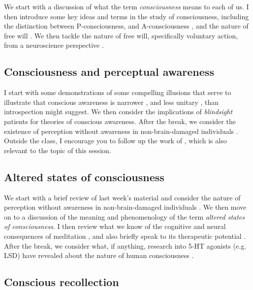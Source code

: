 \documentclass[11pt]{article}
\begin{document}
We start with a discussion of what the term \emph{consciousness} means
to each of us. I then introduce some key ideas and terms in the study
of consciousness, including the distinction between P-consciousness,
and A-consciousness \cite{block95}, and the nature of free will
\cite{freewill}.  We then tackle the nature of free will, specifically
voluntary action, from a neuroscience perspective
\cite{lau04,libet83,haggard05}.

\subsection{Consciousness and perceptual awareness}

I start with some demonstrations of some compelling illusions that
serve to illustrate that conscious awareness is narrower
\cite{simons05}, and less unitary \cite{aglioti95}, than introspection
might suggest. We then consider the implications of \emph{blindsight}
patients \cite{cowey04, azzopardi97, kentridge99} for theories of
conscious awareness. After the break, we consider the existence
\cite{williams, kolb95} of perception without awareness in
non-brain-damaged individuals \cite{merikle01}. Outside the class, I
encourage you to follow up the work of , which is
also relevant to the topic of this session.

\subsection{Altered states of consciousness}

We start with a brief review of last week's material and consider the
nature of perception without awareness in non-brain-damaged
individuals \cite{debner94, mccormick97, moore97, marcel83}. We then
move on to a discussion of the meaning and phenomenology of the term
\emph{altered states of consciousness}.  I then review what we know of
the cognitive and neural consequences of meditation \cite{jha07,
  lutz08, lutz04}, and also briefly speak to its therapeutic potential
\cite{miller95, ramel04, tang07}. After the break, we consider what,
if anything, research into 5-HT agonists (e.g. LSD) have revealed
about the nature of human consciousness \cite{nichols04}.

\subsection{Conscious recollection}
\end{document}
